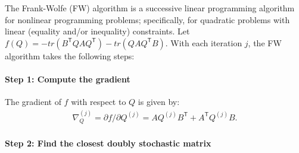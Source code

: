 \documentclass{article} %
\newcommand{\T}{^{\ensuremath{\mathsf{T}}}}           %
\begin{document}
The Frank-Wolfe (FW) algorithm is a successive linear programming algorithm for nonlinear programming problems; specifically, for quadratic problems with linear (equality and/or inequality) constraints. Let $f(Q)=- tr(B\T QAQ\T) - tr(QAQ\T B)$.  With each iteration $j$, the FW algorithm takes the following steps:

\paragraph{Step 1: Compute the gradient} %
\label{par:step_1_computing_the_gradient}

The gradient of $f$ with respect to $Q$ is given by:
\begin{align} \label{eq:grad}
	\nabla_Q^{(j)} = \partial f / \partial Q^{(j)} =  A Q^{(j)} B\T + A\T Q^{(j)} B.
\end{align}


\paragraph{Step 2: Find the closest doubly stochastic matrix} %
\label{par:step_2_finding_the_closest_doubly_stochastic_matrix}
\end{document}

